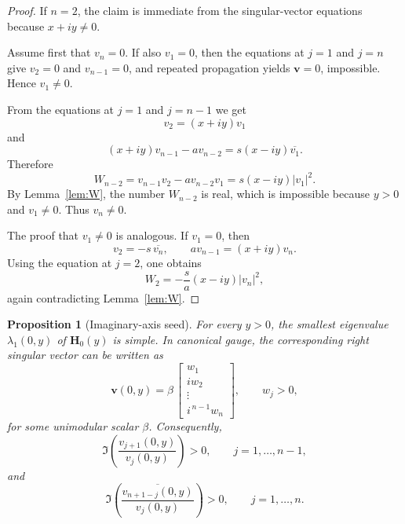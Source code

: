 \documentclass[11pt]{article}
\numberwithin{equation}{section}
\newtheorem{proposition}[theorem]{Proposition}
\begin{document}
\begin{proof}
If $n=2$, the claim is immediate from the singular-vector equations because
$x+iy\neq0$.

Assume first that $v_n=0$.  If also $v_1=0$, then the equations at $j=1$
and $j=n$ give $v_2=0$ and $v_{n-1}=0$, and repeated propagation yields
$\bm v=0$, impossible.  Hence $v_1\neq0$.

From the equations at $j=1$ and $j=n-1$ we get
\[
v_2=(x+iy)v_1
\]
and
\[
(x+iy)v_{n-1}-av_{n-2}=s(x-iy)\overline{v_1}.
\]
Therefore
\[
W_{n-2}
=
v_{n-1}v_2-av_{n-2}v_1
=
s(x-iy)|v_1|^2.
\]
By Lemma~\ref{lem:W}, the number $W_{n-2}$ is real, which is impossible
because $y>0$ and $v_1\neq0$.  Thus $v_n\neq0$.

The proof that $v_1\neq0$ is analogous.  If $v_1=0$, then
\[
v_2=-s\,\overline{v_n},
\qquad
av_{n-1}=(x+iy)v_n.
\]
Using the equation at $j=2$, one obtains
\[
W_2
=
-\frac{s}{a}(x-iy)|v_n|^2,
\]
again contradicting Lemma~\ref{lem:W}.
\end{proof}

\begin{proposition}[Imaginary-axis seed]\label{prop:x0}
For every $y>0$, the smallest eigenvalue $\lambda_1(0,y)$ of $\mathbf H_0(y)$
is simple.  In canonical gauge, the corresponding right singular vector can be
written as
\[
\bm v(0,y)
=
\beta\,
\begin{bmatrix}
w_1\\
iw_2\\
\vdots\\
i^{\,n-1}w_n
\end{bmatrix},
\qquad
w_j>0,
\]
for some unimodular scalar $\beta$.  Consequently,
\[
\Im\!\left(\frac{v_{j+1}(0,y)}{v_j(0,y)}\right)>0,
\qquad
j=1,\dots,n-1,
\]
and
\[
\Im\!\left(\frac{\overline{v_{n+1-j}(0,y)}}{v_j(0,y)}\right)>0,
\qquad
j=1,\dots,n.
\]
\end{proposition}
\end{document}
